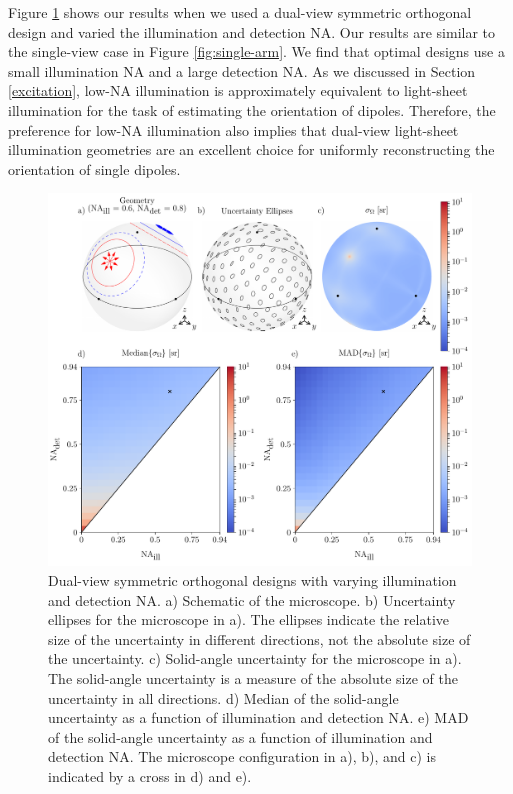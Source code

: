 \documentclass[10pt]{article}
\begin{document}
Figure \ref{fig:double-arm} shows our results when we used a dual-view symmetric
orthogonal design and varied the illumination and detection NA. Our results are
similar to the single-view case in Figure \ref{fig:single-arm}. We find that
optimal designs use a small illumination NA and a large detection NA. As we
discussed in Section \ref{excitation}, low-NA illumination is
approximately equivalent to light-sheet illumination for the task of estimating
the orientation of dipoles. Therefore, the preference for low-NA
illumination also implies that dual-view light-sheet illumination geometries are
an excellent choice for uniformly reconstructing the orientation of single
dipoles.

\begin{figure}[htbp]
\centering\includegraphics[width=\textwidth]{double-arm}
\caption{Dual-view symmetric orthogonal designs with varying
  illumination and detection NA. a) Schematic of the microscope. b) Uncertainty
  ellipses for the microscope in a). The ellipses indicate the relative size of
  the uncertainty in different directions, not the absolute size of the
  uncertainty. c) Solid-angle uncertainty for the microscope in a). The
  solid-angle uncertainty is a measure of the absolute size of the uncertainty
  in all directions. d) Median of the solid-angle uncertainty as a function of
  illumination and detection NA. e) MAD of the solid-angle uncertainty
  as a function of illumination and detection NA. The microscope configuration
  in a), b), and c) is indicated by a cross in d) and e).}
\label{fig:double-arm}
\end{figure}
\end{document}
